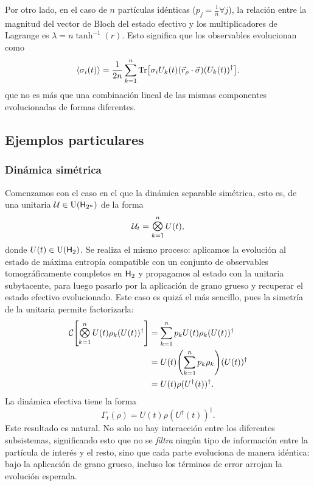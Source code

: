 Por otro lado, en el caso de $n$ partículas idénticas  ($p_{j}=\frac{1}{n}\forall j$), la relación entre la magnitud del vector de Bloch del estado efectivo y los multiplicadores de Lagrange es $\lambda=n\tanh^{-1}(r)$. Esto significa que los observables evolucionan como
\begin{equation*}
    \expval{\sigma_{i}(t)}=\frac{1}{2n}\sum_{k=1}^{n}\Tr[\sigma_{i}U_{k}(t) (\vec{r}_{\rho}\cdot\vec{\sigma}) (U_{k}(t))^{\dag}].
\end{equation*}
que no es más que una combinación lineal de las mismas componentes evolucionadas de formas diferentes.
\subsection{Ejemplos particulares}

\subsubsection{Dinámica simétrica}

Comenzamos con el caso en el que la dinámica separable simétrica, esto es, de una unitaria $\mathcal{U}\in\text{U}({\sf H}_{2^{n}})$ de la forma
\begin{equation*}
    \mcU_{t}=\Motimes_{k=1}^{n}U(t),
\end{equation*}
donde $U(t)\in\text{U}({\sf H}_{2})$. Se realiza el mismo proceso: aplicamos la evolución al estado de máxima entropía compatible con un conjunto de observables tomográficamente completos en ${\sf H}_{2}$ y propagamos al estado con la unitaria subytacente, para luego pasarlo por la aplicación de grano grueso y recuperar el estado efectivo evolucionado. Este caso es quizá el más sencillo, pues la simetría de la unitaria permite factorizarla:
\begin{align*}
\mcC\qty[\Motimes_{k=1}^{n}U(t) \rho_{k} (U(t))^{\dag}]&=\sum_{k=1}^{n}p_{k} U(t) \rho_{k} (U(t))^{\dag} \\
&=U(t)\qty(\sum_{k=1}^{n}p_{k} \rho_{k}) (U(t))^{\dag}\\
&=U(t)\rho(U^{\dag}(t))^{\dag}.
\end{align*}
La dinámica efectiva tiene la forma
\begin{equation*}
    \Gamma_{t}(\rho)=U(t)\rho(U^{\dag}(t))^{\dag}.
\end{equation*}
Este resultado es natural. No solo no hay interacción entre los diferentes subsistemas, significando esto que no se \textit{filtra} ningún tipo de información entre la partícula de interés y el resto, sino que cada parte evoluciona de manera idéntica: bajo la aplicación de grano grueso, incluso los términos de error arrojan la evolución esperada.

